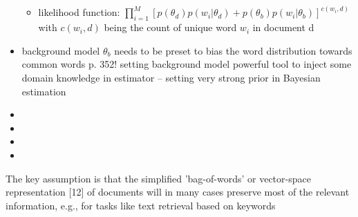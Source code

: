 \documentclass[11pt,a4paper,english,oneside]{book}
\numberwithin{equation}{chapter}
\begin{document}
\begin{itemize}
\begin{itemize}
		\item likelihood function: $\prod_{i = 1}^{M} [ p(\theta_d)p(w_i | \theta_d) + p(\theta_b)p(w_i | \theta_b) ]^{c(w_i, d)} $ with $c(w_i, d)$ being the count of unique word $w_i$ in document d
	\end{itemize}
	\item background model $\theta_b$ needs to be preset to bias the word distribution towards common words p. 352! setting background model powerful tool to inject some domain knowledge in estimator -- setting very strong prior in Bayesian estimation
	\item 
	\item 
	\item 
	\item 
\end{itemize}

The
key assumption is that the simplified 'bag-of-words' or
vector-space representation [12] of documents will in
many cases preserve most of the relevant information,
e.g., for tasks like text retrieval based on keywords \cite[p. 290]{Hofmann.1999}
\end{document}
